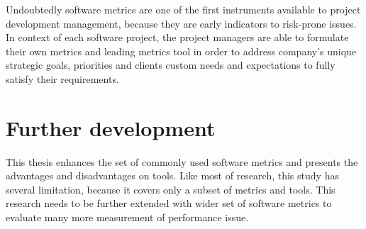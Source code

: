 Undoubtedly software metrics are one of the first instruments available to project development management, because they are early indicators to risk-prone issues. In context of each software project, the project managers are able to formulate their own metrics and leading metrics tool in order to address company's unique strategic goals, priorities and clients custom needs and expectations to fully satisfy their requirements. 

\section{Further development}

This thesis enhances the set of commonly used software metrics and presents the advantages and disadvantages on tools. Like most of research, this study has several limitation, because it covers only a subset of metrics and tools. This research needs to be further extended with wider set of software metrics to evaluate many more measurement of performance issue. 